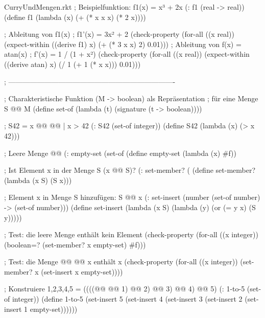 \begin{filecontents*}{CurryUndMengen.rkt}
; Beispielfunktion: f1(x) = x³ + 2x  
(: f1 (real -> real))
(define f1
  (lambda (x) (+ (* x x x)
                 (* 2 x))))

; Ableitung von f1(x)
; f1'(x) = 3x² + 2
(check-property
 (for-all ((x real))
   (expect-within ((derive f1) x)
                  (+ (* 3 x x) 2)
                  0.01)))
; Ableitung von f(x) = atan(x)
; f'(x) = 1 / (1 + x²)
(check-property
 (for-all ((x real))
   (expect-within ((derive atan) x)
                  (/ 1
                     (+ 1 (* x x)))
                  0.01)))

; ----------------------------------------------------------------------

; Charakteristische Funktion (M -> boolean) als Repräsentation 
; für eine Menge S @\latexcode{$\subseteq$}@ M
(define set-of
  (lambda (t)
    (signature (t -> boolean))))

; S42 = { x @\latexcode{$\in$}@ @@ | x > 42 }
(: S42 (set-of integer))
(define S42
  (lambda (x)
    (> x 42))) 

; Leere Menge @\latexcode{\emptyset}@
(: empty-set (set-of %
(define empty-set
  (lambda (x)
    #f))

; Ist Element x in der Menge S (x @\latexcode{\in}@ S)?
(: set-member? (%
(define set-member?
  (lambda (x S)
    (S x)))

; Element x in Menge S hinzufügen: S @\latexcode{\cup}@ {x}
(: set-insert (number (set-of number) -> (set-of number)))
(define set-insert
  (lambda (x S)
    (lambda (y)
      (or (= y x)
          (S y)))))

; Test: die leere Menge enthält kein Element
(check-property
 (for-all ((x integer))
   (boolean=? (set-member? x empty-set) #f)))

; Test: die Menge @\latexcode{\emptyset}@ @\latexcode{\cup}@ {x} enthält x
(check-property
 (for-all ((x integer))
   (set-member? x (set-insert x empty-set))))


; Konstruiere {1,2,3,4,5} = ((((@\latexcode{\emptyset}@ @\latexcode{\cup}@ {1}) @\latexcode{\cup}@ {2}) @\latexcode{\cup}@ {3}) @\latexcode{\cup}@ {4}) @\latexcode{\cup}@ {5})
(: 1-to-5 (set-of integer))
(define 1-to-5
  (set-insert 
   5
   (set-insert 
    4
    (set-insert 
     3
     (set-insert 
      2
      (set-insert 
       1 empty-set))))))



\end{filecontents*}
